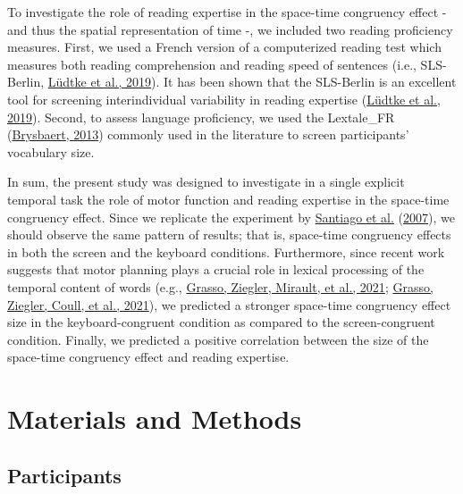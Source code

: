\documentclass[
  a4paper,12pt,twoside,onecolumn,openright,final,oldfontcommands]{memoir}
\begin{document}
To investigate the role of reading expertise in the space-time congruency effect - and thus the spatial representation of time -, we included two reading proficiency measures. First, we used a French version of a computerized reading test which measures both reading comprehension and reading speed of sentences (i.e., SLS-Berlin, \protect\hyperlink{ref-ludtke_sls-berlin_2019}{Lüdtke et al., 2019}). It has been shown that the SLS-Berlin is an excellent tool for screening interindividual variability in reading expertise (\protect\hyperlink{ref-ludtke_sls-berlin_2019}{Lüdtke et al., 2019}). Second, to assess language proficiency, we used the Lextale\_FR (\protect\hyperlink{ref-brysbaert_lextale_fr_2013}{Brysbaert, 2013}) commonly used in the literature to screen participants' vocabulary size.

In sum, the present study was designed to investigate in a single explicit temporal task the role of motor function and reading expertise in the space-time congruency effect. Since we replicate the experiment by \protect\hyperlink{ref-santiago_time_2007}{Santiago et al.} (\protect\hyperlink{ref-santiago_time_2007}{2007}), we should observe the same pattern of results; that is, space-time congruency effects in both the screen and the keyboard conditions. Furthermore, since recent work suggests that motor planning plays a crucial role in lexical processing of the temporal content of words (e.g., \protect\hyperlink{ref-grasso_as_2021}{Grasso, Ziegler, Mirault, et al., 2021}; \protect\hyperlink{ref-grasso_eye_2021}{Grasso, Ziegler, Coull, et al., 2021}), we predicted a stronger space-time congruency effect size in the keyboard-congruent condition as compared to the screen-congruent condition. Finally, we predicted a positive correlation between the size of the space-time congruency effect and reading expertise.

\hypertarget{materials-and-methods-1}{%
\section{Materials and Methods}\label{materials-and-methods-1}}

\hypertarget{participants-4}{%
\subsection{Participants}\label{participants-4}}
\end{document}
